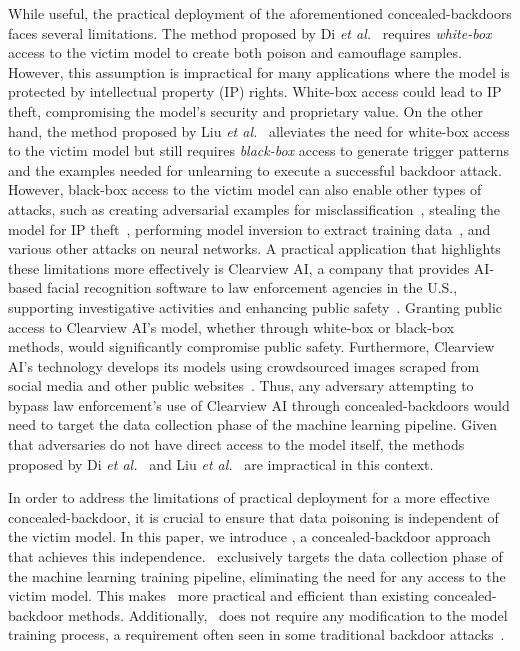 While useful, the practical deployment of the aforementioned concealed-backdoors faces several limitations. The method proposed by Di \textit{et al.}~\cite{DBLP:conf/nips/DiDA0S23} requires \textit{white-box} access to the victim model to create both poison and camouflage samples. However, this assumption is impractical for many applications where the model is protected by intellectual property (IP) rights. White-box access could lead to IP theft, compromising the model's security and proprietary value. On the other hand, the method proposed by Liu \textit{et al.}~\cite{DBLP:conf/aaai/LiuWHM24} alleviates the need for white-box access to the victim model but still requires \textit{black-box} access to generate trigger patterns and the examples needed for unlearning to execute a successful backdoor attack. However, black-box access to the victim model can also enable other types of attacks, such as creating adversarial examples for misclassification~\cite{adversarial_example_survey}, stealing the model for IP theft~\cite{model_stealing_survey}, performing model inversion to extract training data~\cite{model_inversion_sok}, and various other attacks on neural networks. A practical application that highlights these limitations more effectively is Clearview AI, a company that provides AI-based facial recognition software to law enforcement agencies in the U.S., supporting investigative activities and enhancing public safety~\cite{clearview,clearview_usage}. Granting public access to Clearview AI's model, whether through white-box or black-box methods, would significantly compromise public safety. Furthermore, Clearview AI's technology develops its models using crowdsourced images scraped from social media and other public websites~\cite{clearview_faq,clearview_data}. Thus, any adversary attempting to bypass law enforcement's use of Clearview AI through concealed-backdoors would need to target the data collection phase of the machine learning pipeline. Given that adversaries do not have direct access to the model itself, the methods proposed by Di \textit{et al.}~\cite{DBLP:conf/nips/DiDA0S23} and Liu \textit{et al.}~\cite{DBLP:conf/aaai/LiuWHM24} are impractical in this context.

In order to address the limitations of practical deployment for a more effective concealed-backdoor, it is crucial to ensure that data poisoning is independent of the victim model. In this paper, we introduce \methodname, a concealed-backdoor approach that achieves this independence. \methodname~exclusively targets the data collection phase of the machine learning training pipeline, eliminating the need for any access to the victim model. This makes \methodname~more practical and efficient than existing concealed-backdoor methods. Additionally, \methodname~does not require any modification to the model training process, a requirement often seen in some traditional backdoor attacks~\cite{inputaware,blind,lira}.

